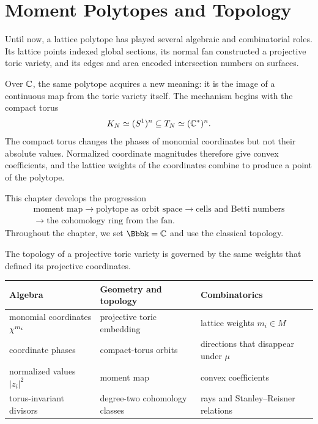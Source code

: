 \chapter{Moment Polytopes and Topology}
\label{chap:moment-polytopes-topology}

\begin{chapteroverview}
Until now, a lattice polytope has played several algebraic and
combinatorial roles. Its lattice points indexed global sections, its
normal fan constructed a projective toric variety, and its edges and
area encoded intersection numbers on surfaces.

Over \(\mathbb{C}\), the same polytope acquires a new meaning: it is the image
of a continuous map from the toric variety itself. The mechanism begins
with the compact torus
\[
K_N\simeq(S^1)^n\subseteq T_N\simeq(\mathbb{C}^*)^n.
\]
The compact torus changes the phases of monomial coordinates but not
their absolute values. Normalized coordinate magnitudes therefore give
convex coefficients, and the lattice weights of the coordinates combine
to produce a point of the polytope.

This chapter develops the progression
\[
\boxed{
\begin{gathered}
\text{moment map}
\longrightarrow
\text{polytope as orbit space}
\longrightarrow
\text{cells and Betti numbers}
\\[-1mm]
\longrightarrow
\text{the cohomology ring from the fan}.
\end{gathered}}
\]
Throughout the chapter, we set \(\Bbbk=\CC\) and use the classical
topology.
\end{chapteroverview}

\begin{threedictionaries}
The topology of a projective toric variety is governed by the same
weights that defined its projective coordinates.

\medskip

\begin{center}
\small
\begin{tabularx}{\linewidth}{@{}
  >{\raggedright\arraybackslash}X
  >{\raggedright\arraybackslash}X
  >{\raggedright\arraybackslash}X@{}}
\toprule
\textbf{Algebra}
&
\textbf{Geometry and topology}
&
\textbf{Combinatorics}
\\
\midrule
monomial coordinates \(\chi^{m_i}\)
&
projective toric embedding
&
lattice weights \(m_i\in M\)
\\
coordinate phases
&
compact-torus orbits
&
directions that disappear under \(\mu\)
\\
normalized values \(\lvert z_i\rvert^2\)
&
moment map
&
convex coefficients
\\
torus-invariant divisors
&
degree-two cohomology classes
&
rays and Stanley--Reisner relations
\\
\bottomrule
\end{tabularx}
\end{center}
\end{threedictionaries}

